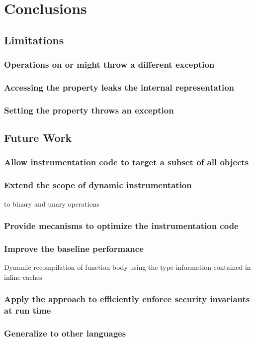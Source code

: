 \chapter{Conclusions}

\section{Limitations}

\subsection{Operations on  or  might throw a different exception}

\subsection{Accessing the  property leaks the internal representation}

\subsection{Setting the  property throws an exception}

\section{Future Work}

\subsection{Allow instrumentation code to target a subset of all objects}

\subsection{Extend the scope of dynamic instrumentation}

to binary and unary operations

\subsection{Provide mecanisms to optimize the instrumentation code}

\subsection{Improve the baseline performance}

Dynamic recompilation of function body using the type information contained in inline caches

\subsection{Apply the approach to efficiently enforce security invariants at run time}

\subsection{Generalize to other languages}

